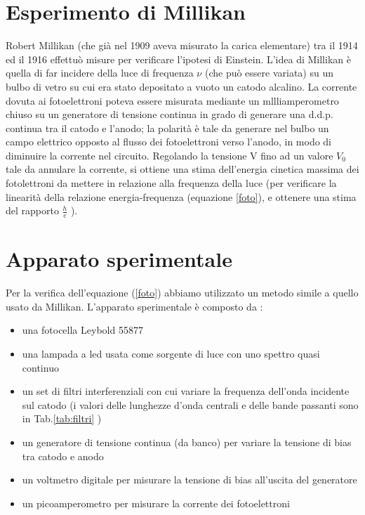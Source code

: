 \documentclass[10pt,a4paper]{article}
\begin{document}
\section*{Esperimento di Millikan}
Robert Millikan (che già nel 1909 aveva misurato la carica elementare) tra il 1914 ed il 1916 effettuò misure per verificare l'ipotesi di Einstein. L'idea di Millikan è quella di far incidere della luce di frequenza $\nu$ (che può essere variata) su un bulbo di vetro su cui era stato depositato a vuoto un catodo alcalino. La corrente dovuta ai fotoelettroni poteva essere misurata mediante un mllliamperometro chiuso su un generatore di tensione continua in grado di generare una d.d.p. continua tra il catodo e l'anodo; la polarità è tale da generare nel bulbo un campo elettrico opposto al flusso dei fotoelettroni verso l'anodo, in modo di diminuire la corrente nel circuito. Regolando la tensione V fino ad un valore $V_{0}$ tale da annulare la corrente, si ottiene una stima dell'energia cinetica massima dei fotolettroni da mettere in relazione alla frequenza della luce (per verificare la linearità della relazione energia-frequenza (equazione \ref{foto}), e ottenere una stima del rapporto $\frac{h}{e}$ ). 
\section*{Apparato sperimentale}
Per la verifica dell'equazione (\ref{foto}) abbiamo utilizzato un metodo simile a quello usato da Millikan. L'apparato sperimentale è composto da :

\begin{itemize}
\item una fotocella Leybold 55877
\item una lampada a led usata come sorgente di luce con uno spettro quasi continuo
\item un set di filtri interferenziali con cui variare la frequenza dell'onda incidente sul catodo (i valori delle lunghezze d'onda centrali e delle bande passanti sono in Tab.\ref{tab:filtri} )
\item un generatore di tensione continua (da banco) per variare la tensione di bias tra catodo e anodo
\item un voltmetro digitale per misurare la tensione di bias all'uscita del generatore
\item un picoamperometro per misurare la corrente dei fotoelettroni
\end{itemize}
\end{document}
